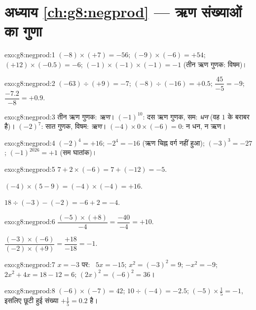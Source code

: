 \section*{अध्याय \ref{ch:g8:negprod} --- ऋण संख्याओं का गुणा}

\begin{solution}{exo:g8:negprod:1}
$(-8) \times (+7) = -56$; \quad
$(-9) \times (-6) = +54$; \quad
$(+12) \times (-0.5) = -6$; \quad
$(-1) \times (-1) \times (-1) = -1$ (तीन ऋण गुणक: विषम)।
\end{solution}

\begin{solution}{exo:g8:negprod:2}
$(-63) \div (+9) = -7$; \quad
$(-8) \div (-16) = +0.5$; \quad
$\dfrac{45}{-5} = -9$; \quad
$\dfrac{-7.2}{-8} = +0.9$.
\end{solution}

\begin{solution}{exo:g8:negprod:3}
तीन ऋण गुणक: \emph{ऋण}। \quad
$(-1)^{10}$: दस ऋण गुणक, सम: \emph{धन} (वह $1$ के बराबर है)।
\quad
$(-2)^7$: सात गुणक, विषम: \emph{ऋण}। \quad
$(-4) \times 0 \times (-6) = 0$: न धन, न ऋण।
\end{solution}

\begin{solution}{exo:g8:negprod:4}
$(-2)^4 = +16$; \quad $-2^4 = -16$ (ऋण चिह्न वर्ग नहीं हुआ); \quad
$(-3)^3 = -27$; \quad $(-1)^{2026} = +1$ (सम घातांक)।
\end{solution}

\begin{solution}{exo:g8:negprod:5}
$7 + 2 \times (-6) = 7 + (-12) = -5$.

$(-4) \times (5 - 9) = (-4) \times (-4) = +16$.

$18 \div (-3) - (-2) = -6 + 2 = -4$.
\end{solution}

\begin{solution}{exo:g8:negprod:6}
$\dfrac{(-5) \times (+8)}{-4} = \dfrac{-40}{-4} = +10$.

$\dfrac{(-3) \times (-6)}{(-2) \times (+9)} = \dfrac{+18}{-18} = -1$.
\end{solution}

\begin{solution}{exo:g8:negprod:7}
$x = -3$ पर: \ $5x = -15$; \quad $x^2 = (-3)^2 = 9$; \quad
$-x^2 = -9$; \quad $2x^2 + 4x = 18 - 12 = 6$; \quad
$(2x)^2 = (-6)^2 = 36$।
\end{solution}

\begin{solution}{exo:g8:negprod:8}
$(-6) \times (-7) = 42$; \quad
$10 \div (-4) = -2.5$; \quad
$(-5) \times \frac15 = -1$, इसलिए छूटी हुई संख्या
$+\frac15 = 0.2$ है।
\end{solution}

